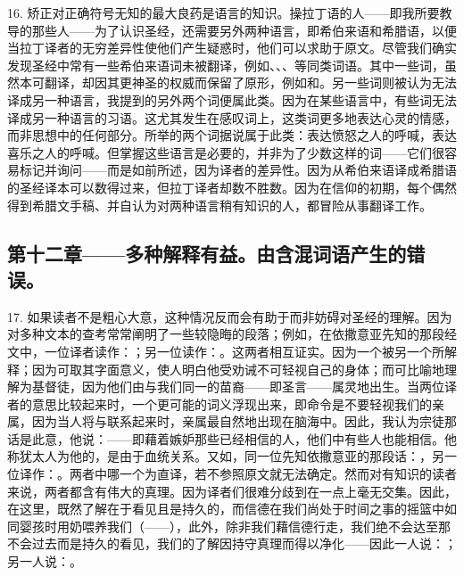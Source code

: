 16. 矫正对正确符号无知的最大良药是语言的知识。操拉丁语的人——即我所要教导的那些人——为了认识圣经，还需要另外两种语言，即希伯来语和希腊语，以便当拉丁译者的无穷差异性使他们产生疑惑时，他们可以求助于原文。尽管我们确实发现圣经中常有一些希伯来语词未被翻译，例如、、、等同类词语。其中一些词，虽然本可翻译，却因其更神圣的权威而保留了原形，例如和。另一些词则被认为无法译成另一种语言，我提到的另外两个词便属此类。因为在某些语言中，有些词无法译成另一种语言的习语。这尤其发生在感叹词上，这类词更多地表达心灵的情感，而非思想中的任何部分。所举的两个词据说属于此类：表达愤怒之人的呼喊，表达喜乐之人的呼喊。但掌握这些语言是必要的，并非为了少数这样的词——它们很容易标记并询问——而是如前所述，因为译者的差异性。因为从希伯来语译成希腊语的圣经译本可以数得过来，但拉丁译者却数不胜数。因为在信仰的初期，每个偶然得到希腊文手稿、并自认为对两种语言稍有知识的人，都冒险从事翻译工作。\par


\subsection{第十二章——多种解释有益。由含混词语产生的错误。}

17. 如果读者不是粗心大意，这种情况反而会有助于而非妨碍对圣经的理解。因为对多种文本的查考常常阐明了一些较隐晦的段落；例如，在依撒意亚先知的那段经文中，一位译者读作：；另一位读作：。这两者相互证实。因为一个被另一个所解释；因为可取其字面意义，使人明白他受劝诫不可轻视自己的身体；而可比喻地理解为基督徒，因为他们由与我们同一的苗裔——即圣言——属灵地出生。当两位译者的意思比较起来时，一个更可能的词义浮现出来，即命令是不要轻视我们的亲属，因为当人将与联系起来时，亲属最自然地出现在脑海中。因此，我认为宗徒那话是此意，他说：——即藉着嫉妒那些已经相信的人，他们中有些人也能相信。他称犹太人为他的，是由于血统关系。又如，同一位先知依撒意亚的那段话：，另一位译作：。两者中哪一个为直译，若不参照原文就无法确定。然而对有知识的读者来说，两者都含有伟大的真理。因为译者们很难分歧到在一点上毫无交集。因此，在这里，既然了解在于看见且是持久的，而信德在我们尚处于时间之事的摇篮中如同婴孩时用奶喂养我们（——），此外，除非我们藉信德行走，我们绝不会达至那不会过去而是持久的看见，我们的了解因持守真理而得以净化——因此一人说：；另一人说：。\par

